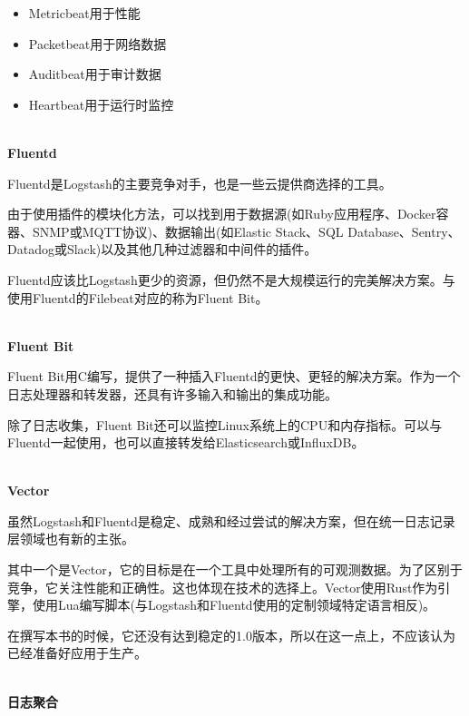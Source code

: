 \begin{itemize}
\item 
Metricbeat用于性能

\item 
Packetbeat用于网络数据

\item 
Auditbeat用于审计数据

\item 
Heartbeat用于运行时监控
\end{itemize}

\hspace*{\fill} \\ %
\noindent
\textbf{Fluentd}

Fluentd是Logstash的主要竞争对手，也是一些云提供商选择的工具。

由于使用插件的模块化方法，可以找到用于数据源(如Ruby应用程序、Docker容器、SNMP或MQTT协议)、数据输出(如Elastic Stack、SQL Database、Sentry、Datadog或Slack)以及其他几种过滤器和中间件的插件。

Fluentd应该比Logstash更少的资源，但仍然不是大规模运行的完美解决方案。与使用Fluentd的Filebeat对应的称为Fluent Bit。

\hspace*{\fill} \\ %
\noindent
\textbf{Fluent Bit}

Fluent Bit用C编写，提供了一种插入Fluentd的更快、更轻的解决方案。作为一个日志处理器和转发器，还具有许多输入和输出的集成功能。

除了日志收集，Fluent Bit还可以监控Linux系统上的CPU和内存指标。可以与Fluentd一起使用，也可以直接转发给Elasticsearch或InfluxDB。

\hspace*{\fill} \\ %
\noindent
\textbf{Vector}

虽然Logstash和Fluentd是稳定、成熟和经过尝试的解决方案，但在统一日志记录层领域也有新的主张。

其中一个是Vector，它的目标是在一个工具中处理所有的可观测数据。为了区别于竞争，它关注性能和正确性。这也体现在技术的选择上。Vector使用Rust作为引擎，使用Lua编写脚本(与Logstash和Fluentd使用的定制领域特定语言相反)。

在撰写本书的时候，它还没有达到稳定的1.0版本，所以在这一点上，不应该认为已经准备好应用于生产。

\hspace*{\fill} \\ %
\noindent
\textbf{日志聚合}

